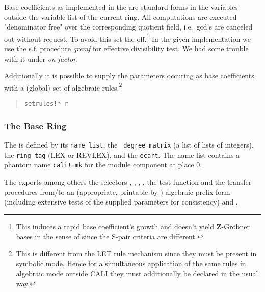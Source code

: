 Base coefficients as implemented in the  are standard
forms in the variables outside the variable list of the current
ring. All computations are executed "denominator free" over the
corresponding quotient field, i.e.\ gcd's are canceled out without
request. To avoid this set the  off.\footnote{This
induces a rapid base coefficient's growth and doesn't yield \textbf{Z}-Gr\"obner
bases in the sense of \cite{Gianni:88} since the S-pair criteria are
different.} In the given implementation we use the s.f. procedure {\em
qremf} for effective divisibility test. We had some trouble with it
under \emph{on factor}.

Additionally it is possible to supply the
parameters occuring as base coefficients with a (global) set of
algebraic rules.\footnote{This is different from the LET rule
mechanism since they must be present in symbolic mode. Hence for a
simultaneous application of the same rules in algebraic mode outside
CALI they must additionally be declared in the usual way.}
\begin{quote}
\verb|setrules!* r|

\end{quote}

\subsubsection{The Base Ring}

The  is defined by its \texttt{name list}, the {\tt
degree matrix} (a list of lists of integers), the \texttt{ring tag} (LEX
or REVLEX), and the \texttt{ecart}. The name list contains a phantom
name \texttt{cali!=mk} for the module component at place 0.
\medskip

The  exports among others the selectors
, , ,
, the test function  and the
transfer procedures from/to an (appropriate, printable by
) algebraic prefix form  (including
extensive tests of the supplied parameters for consistency) and
.

